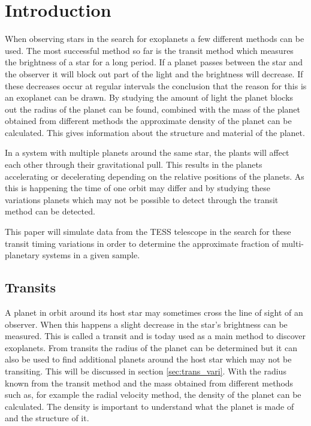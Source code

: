 \documentclass[12pt]{report}
\begin{document}
\chapter{Introduction}
When observing stars in the search for exoplanets a few different methods can be used. The most successful method so far is the transit method which measures the brightness of a star for a long period. If a planet passes between the star and the observer it will block out part of the light and the brightness will decrease. If these decreases occur at regular intervals the conclusion that the reason for this is an exoplanet can be drawn. By studying the amount of light the planet blocks out the radius of the planet can be found, combined with the mass of the planet obtained from different methods the approximate density of the planet can be calculated. This gives information about the structure and material of the planet.

In a system with multiple planets around the same star, the plants will affect each other through their gravitational pull. This results in the planets accelerating or decelerating depending on the relative positions of the planets. As this is happening the time of one orbit may differ and by studying these variations planets which may not be possible to detect through the transit method can be detected.

This paper will simulate data from the TESS telescope in the search for these transit timing variations in order to determine the approximate fraction of multi-planetary systems in a given sample.

\section{Transits}
	A planet in orbit around its host star may sometimes cross the line of sight of an observer. When this happens a slight decrease in the star's brightness can be measured. This is called a transit and is today used as a main method to discover exoplanets. From transits the radius of the planet can be determined but it can also be used to find additional planets around the host star which may not be transiting. This will be discussed in section \ref{sec:trans_vari}. With the radius known from the transit method and the mass obtained from different methods such as, for example the radial velocity method, the density of the planet can be calculated. The density is important to understand what the planet is made of and the structure of it.
\end{document}
